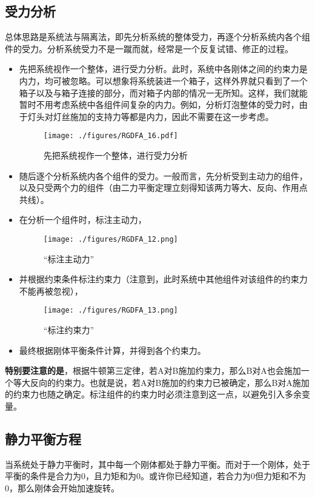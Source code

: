\subsection{受力分析}
总体思路是系统法与隔离法，即先分析系统的整体受力，再逐个分析系统内各个组件的受力。分析系统受力不是一蹴而就，经常是一个反复试错、修正的过程。
\begin{itemize}
\item 先把系统视作一个整体，进行受力分析。此时，系统中各刚体之间的约束力是内力，均可被忽略。可以想象将系统装进一个箱子，这样外界就只看到了一个箱子以及与箱子连接的部分，而对箱子内部的情况一无所知。这样，我们就能暂时不用考虑系统中各组件间复杂的内力。例如，分析灯泡整体的受力时，由于灯头对灯丝施加的支持力等都是内力，因此不需要在这一步考虑。
\begin{figure}[ht]
\centering
\texttt{[image: ./figures/RGDFA\_16.pdf]}
\caption{先把系统视作一个整体，进行受力分析} \label{RGDFA_fig16}
\end{figure}

\item 随后逐个分析系统内各个组件的受力。一般而言，先分析受到主动力的组件，以及只受两个力的组件（由二力平衡定理立刻得知该两力等大、反向、作用点共线）。
\item 在分析一个组件时，标注主动力，
\begin{figure}[ht]
\centering
\texttt{[image: ./figures/RGDFA\_12.png]}
\caption{“标注主动力”} \label{RGDFA_fig12}
\end{figure}
\item 并根据约束条件标注约束力（注意到，此时系统中其他组件对该组件的约束力不能再被忽视），
\begin{figure}[ht]
\centering
\texttt{[image: ./figures/RGDFA\_13.png]}
\caption{“标注约束力”} \label{RGDFA_fig13}
\end{figure}
\item 最终根据刚体平衡条件计算，并得到各个约束力。
\end{itemize}

\textbf{特别要注意的是}，根据牛顿第三定律，若A对B施加约束力，那么B对A也会施加一个等大反向的约束力。也就是说，若A对B施加的约束力已被确定，那么B对A施加的约束力也随之确定。标注组件的约束力时必须注意到这一点，以避免引入多余变量。

\subsection{静力平衡方程}\label{RGDFA_sub1}
当系统处于静力平衡时，其中每一个刚体都处于静力平衡。而对于一个刚体，处于平衡的条件是合力为0，且力矩和为0。或许你已经知道，若合力为0但力矩和不为0，那么刚体会开始加速旋转。

